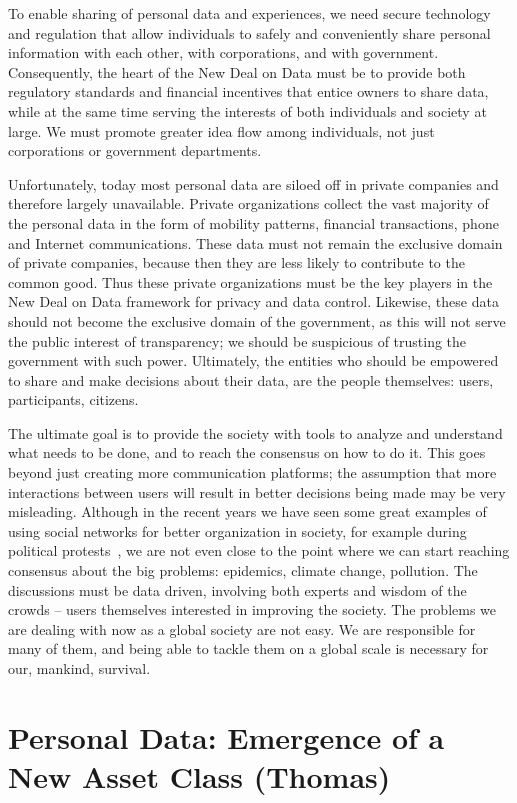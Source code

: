 To enable sharing of personal data and experiences, we need secure technology and regulation that allow individuals to safely and conveniently share personal information with each other, with corporations, and with government.
Consequently, the heart of the New Deal on Data must be to provide both regulatory standards and financial incentives that entice owners to share data, while at the same time serving the interests of both individuals and society at large.
We must promote greater idea flow among individuals, not just corporations or government departments.

Unfortunately, today most personal data are siloed off in private companies and therefore largely unavailable.
Private organizations collect the vast majority of the personal data in the form of mobility patterns, financial transactions, phone and Internet communications.
These data must not remain the exclusive domain of private companies, because then they are less likely to contribute to the common good.
Thus these private organizations must be the key players in the New Deal on Data framework for privacy and data control.
Likewise, these data should not become the exclusive domain of the government, as this will not serve the public interest of transparency; we should be suspicious of trusting the government with such power.
Ultimately, the entities who should be empowered to share and make decisions about their data, are the people themselves: users, participants, citizens.

The ultimate goal is to provide the society with tools to analyze and understand what needs to be done, and to reach the consensus on how to do it.
This goes beyond just creating more communication platforms; the assumption that more interactions between users will result in better decisions being made may be very misleading. 
Although in the recent years we have seen some great examples of using social networks for better organization in society, for example during political protests~\cite{grossman2009iran, barry2009protests}, we are not even close to the point where we can start reaching consensus about the big problems: epidemics, climate change, pollution.
The discussions must be data driven, involving both experts and wisdom of the crowds -- users themselves interested in improving the society.
The problems we are dealing with now as a global society are not easy. 
We are responsible for many of them, and being able to tackle them on a global scale is necessary for our, mankind, survival.

\section{Personal Data: Emergence of a New Asset Class (Thomas)}


